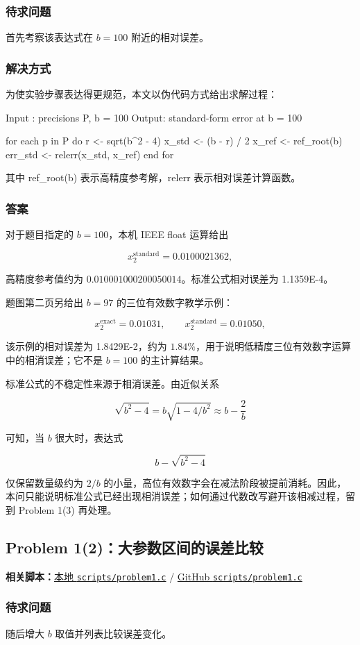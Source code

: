 \documentclass[12pt,a4paper,fontset=none]{ctexart}
\newcommand{\blocktitle}[1]{\subsubsection{#1}}
\newcommand{\codeinline}[1]{{\normalfont #1}}
\newcommand{\fileinline}[1]{{\urlstyle{same}\nolinkurl{#1}}}
\newcommand{\scriptpath}[1]{\fileinline{#1}}
\newcommand{\githubscriptsbase}{https://github.com/Void0312Aurora/computational-physics-homework-2026/blob/main/03/scripts}
\newcommand{\scriptlink}[1]{\noindent\textbf{相关脚本：}\href{../../../scripts/#1}{本地 \scriptpath{scripts/#1}} / \href{\githubscriptsbase/#1}{GitHub \scriptpath{scripts/#1}}\par\medskip}
\begin{document}
\blocktitle{待求问题}

首先考察该表达式在 \(b=100\) 附近的相对误差。

\blocktitle{解决方式}

为使实验步骤表达得更规范，本文以伪代码方式给出求解过程：

\begin{CodeBlock}
Input : precisions P, b = 100
Output: standard-form error at b = 100

for each p in P do
    r <- sqrt(b^2 - 4)
    x_std <- (b - r) / 2
    x_ref <- ref_root(b)
    err_std <- relerr(x_std, x_ref)
end for
\end{CodeBlock}

其中 \codeinline{ref\_root(b)} 表示高精度参考解，\codeinline{relerr} 表示相对误差计算函数。

\blocktitle{答案}

对于题目指定的 \(b=100\)，本机 IEEE \codeinline{float} 运算给出

\[
x_2^{\text{standard}} = 0.0100021362,
\]

高精度参考值约为 \(0.010001000200050014\)。标准公式相对误差为 1.1359E-4。

题图第二页另给出 \(b=97\) 的三位有效数字教学示例：

\[
x_2^{\text{exact}} = 0.01031, \qquad
x_2^{\text{standard}} = 0.01050,
\]

该示例的相对误差为 1.8429E-2，约为 \(1.84\%\)，用于说明低精度三位有效数字运算中的相消误差；它不是 \(b=100\) 的主计算结果。

标准公式的不稳定性来源于相消误差。由近似关系

\[
\sqrt{b^2-4} = b\sqrt{1-4/b^2} \approx b - \frac{2}{b}
\]

可知，当 \(b\) 很大时，表达式

\[
b - \sqrt{b^2 - 4}
\]

仅保留数量级约为 \(2/b\) 的小量，高位有效数字会在减法阶段被提前消耗。因此，本问只能说明标准公式已经出现相消误差；如何通过代数改写避开该相减过程，留到 Problem 1(3) 再处理。

\subsection{Problem 1(2)：大参数区间的误差比较}\label{problem-12ux5927ux53c2ux6570ux533aux95f4ux7684ux8befux5deeux6bd4ux8f83}

\scriptlink{problem1.c}

\blocktitle{待求问题}

随后增大 \(b\) 取值并列表比较误差变化。
\end{document}
